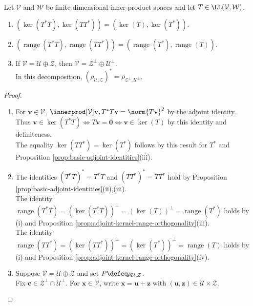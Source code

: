 \begin{proposition} \label{prop:adjoint-product-kernels-ranges-and-projections} \\
Let $\mathcal{V}$ and $\mathcal{W}$ be finite-dimensional inner-product spaces and let $T\in\LL(\mathcal{V},\mathcal{W})$.
\begin{enumerate}[label=(\roman*)]
\setlength{\itemsep}{0pt}
\item $(\ker(T^*T),\ker(TT^*))=(\ker(T),\ker(T^*))$.
\item $(\operatorname{range}(T^*T),\operatorname{range}(TT^*))=(\operatorname{range}(T^*),\operatorname{range}(T))$.
\item If $\mathcal{V}=\mathcal{U}\oplus\mathcal{Z}$, then $\mathcal{V}=\mathcal{Z}^{\perp}\oplus\mathcal{U}^{\perp}$.\\
In this decomposition, $(\rho_{\mathcal{U},\mathcal{Z}})^*=\rho_{\mathcal{Z}^{\perp},\mathcal{U}^{\perp}}$.
\end{enumerate}
\begin{proof}
\begin{enumerate}[label=(\roman*)]
\setlength{\itemsep}{0pt}
\item For $\mathbf{v}\in\mathcal{V}$, $\innerprod[\mathcal{V}]{\mathbf{v},T^*T\mathbf{v}}=\norm{T\mathbf{v}}^2$ by the adjoint identity.\\
Thus $\mathbf{v}\in\ker(T^*T)\Longleftrightarrow T\mathbf{v}=\mathbf{0}\Longleftrightarrow\mathbf{v}\in\ker(T)$ by this identity and definiteness.\\
The equality $\ker(TT^*)=\ker(T^*)$ follows by this result for $T^*$ and Proposition \ref{prop:basic-adjoint-identities}(iii).
\item The identities $(T^*T)^*=T^*T$ and $(TT^*)^*=TT^*$ hold by Proposition \ref{prop:basic-adjoint-identities}(ii),(iii).\\
The identity $\operatorname{range}(T^*T)=(\ker(T^*T))^{\perp}=(\ker(T))^{\perp}=\operatorname{range}(T^*)$ holds by (i) and Proposition \ref{prop:adjoint-kernel-range-orthogonality}(iii).\\
The identity $\operatorname{range}(TT^*)=(\ker(TT^*))^{\perp}=(\ker(T^*))^{\perp}=\operatorname{range}(T)$ holds by (i) and Proposition \ref{prop:adjoint-kernel-range-orthogonality}(iv).
\item Suppose $\mathcal{V}=\mathcal{U}\oplus\mathcal{Z}$ and set $P\defeq\rho_{\mathcal{U},\mathcal{Z}}$.\\
Fix $\mathbf{c}\in\mathcal{Z}^{\perp}\cap\mathcal{U}^{\perp}$. For $\mathbf{x}\in\mathcal{V}$, write $\mathbf{x}=\mathbf{u}+\mathbf{z}$ with $(\mathbf{u},\mathbf{z})\in\mathcal{U}\times\mathcal{Z}$.\\

\end{enumerate}
\end{proof}
\end{proposition}
